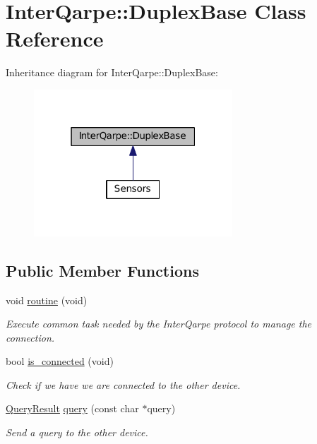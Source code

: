 \hypertarget{classInterQarpe_1_1DuplexBase}{\section{Inter\+Qarpe\+:\+:Duplex\+Base Class Reference}
\label{classInterQarpe_1_1DuplexBase}
}


Inheritance diagram for Inter\+Qarpe\+:\+:Duplex\+Base\+:\nopagebreak
\begin{figure}[H]
\begin{center}
\leavevmode
\includegraphics[width=211pt]{classInterQarpe_1_1DuplexBase__inherit__graph}
\end{center}
\end{figure}
\subsection*{Public Member Functions}
\begin{DoxyCompactItemize}
\item 
void \hyperlink{classInterQarpe_1_1DuplexBase_afd89e07392cc99212fa7fdaa5b4f1ca9}{routine} (void)
\begin{DoxyCompactList}\small\item\em Execute common task needed by the Inter\+Qarpe protocol to manage the connection. \end{DoxyCompactList}\item 
bool \hyperlink{classInterQarpe_1_1DuplexBase_a625debf26eb65849e398b46b26c4bb10}{is\+\_\+connected} (void)
\begin{DoxyCompactList}\small\item\em Check if we have we are connected to the other device. \end{DoxyCompactList}\item 
\hyperlink{classInterQarpe_1_1QueryResult}{Query\+Result} \hyperlink{classInterQarpe_1_1DuplexBase_a854f6b7c2a7a11bbd3e21b1db5cd8d6b}{query} (const char $\ast$query)
\begin{DoxyCompactList}\small\item\em Send a query to the other device. \end{DoxyCompactList}\end{DoxyCompactItemize}
